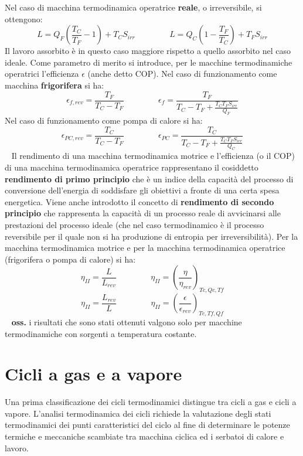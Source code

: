 Nel caso di macchina termodinamica operatrice \textbf{reale}, o irreversibile, si ottengono: 
\[
    L = Q_F\left(\frac{T_C}{T_F}-1\right) + T_C S_{irr} \;\;\;\;\;\;\;\;\;\;\;\;\;\;\; L = Q_C \left(1- \frac{T_F}{T_C}\right) + T_F S_{irr}
\]
Il lavoro assorbito è in questo caso maggiore rispetto a quello assorbito nel caso ideale. \newline
\newline
Come parametro di merito si introduce, per le macchine termodinamiche operatrici
l’efficienza $\epsilon$ (anche detto COP). \newline
\newline
Nel caso di funzionamento come macchina \textbf{frigorifera} si ha: 
\[
    \epsilon_{f,rev} = \frac{T_F}{T_C-T_F} \;\;\;\;\;\;\;\;\;\;\;\;\;\;\; \epsilon_{f} = \frac{T_F}{T_C-T_F + \frac{T_CT_FS_{irr}}{Q_F}}
\]
Nel caso di funzionamento come pompa di calore si ha:
\[
    \epsilon_{PC, rev} = \frac{T_C}{T_C-T_F} \;\;\;\;\;\;\;\;\;\;\;\;\;\;\; \epsilon_{PC} = \frac{T_C}{T_C-T_F + \frac{T_CT_FS_{irr}}{Q_C}}
\]
\ \newline
Il rendimento di una macchina termodinamica motrice e l’efficienza (o il COP) di una
macchina termodinamica operatrice rappresentano il cosiddetto \textbf{rendimento di primo
principio} che è un indice della capacità del processo di conversione dell’energia di soddisfare
gli obiettivi a fronte di una certa spesa energetica. \newline
\newline
Viene anche introdotto il concetto di \textbf{rendimento di secondo principio} che rappresenta la
capacità di un processo reale di avvicinarsi alle prestazioni del processo ideale (che nel caso
termodinamico è il processo reversibile per il quale non si ha produzione di entropia per
irreversibilità). Per la macchina termodinamica motrice e per la macchina termodinamica
operatrice (frigorifera o pompa di calore) si ha: 
\[
    \eta_{II} = \frac{L}{L_{rev}} \;\;\;\;\;\;\;\;\;\;\;\;\;\;\; \eta_{II} = \left(\frac{\eta}{\eta_{rev}}\right)_{Tc, Qc, Tf}
\]
\[
    \eta_{II} = \frac{L_{rev}}{L} \;\;\;\;\;\;\;\;\;\;\;\;\;\;\; \eta_{II} = \left(\frac{\epsilon}{\epsilon_{rev}}\right)_{Tc,Tf,Qf}
\]
\ \newline
\textbf{oss.} i risultati che sono stati ottenuti valgono solo per macchine termodinamiche con
sorgenti a temperatura costante. 
\section{Cicli a gas e a vapore}
Una prima classificazione dei cicli termodinamici distingue tra cicli a gas e cicli a vapore.
L’analisi termodinamica dei cicli richiede la valutazione degli stati termodinamici dei punti
caratteristici del ciclo al fine di determinare le potenze termiche e meccaniche scambiate tra
macchina ciclica ed i serbatoi di calore e lavoro.
